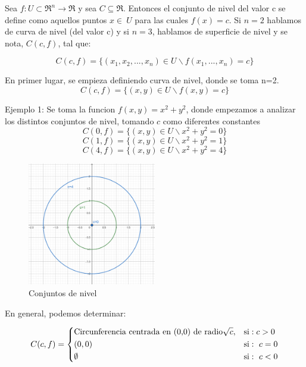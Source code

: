 
\begin{definition}  
\label{def:conjunto de nivel}
 \mbox{}
 
Sea $f: U\subset\Re^n\rightarrow\Re$ y sea $C\subseteq\Re$. Entonces el conjunto de nivel del valor c se define como aquellos puntos $x\in\ U$ para las cuales $f(x)=c$. Si $n=2$ hablamos de curva de nivel (del valor c) y si $n=3$, hablamos de superficie de nivel y se nota, $C(c,f)$, tal que:

 \[
C(c,f)=\{(x_1,x_2,...,x_n) \in U \backslash f (x_1,...,x_n)=c \}
 \]

En primer lugar, se empieza definiendo curva de nivel, donde se toma n=2.
 \[
C(c,f)=\{(x,y) \in U \backslash f (x,y)=c \}
 \]

Ejemplo 1: Se toma la funcion $f(x,y)=x^2+y^2$, donde empezamos a analizar los distintos conjuntos de nivel, tomando $c$ como diferentes constantes
 \[
C(0,f)=\{(x,y) \in U \backslash x^2+y^2=0 \}
\]
 \[
C(1,f)=\{(x,y) \in U \backslash x^2+y^2=1 \}
\]
 \[
C(4,f)=\{(x,y) \in U \backslash x^2+y^2=4 \}
 \]

\begin{figure}[h!] %
    \centering
    \includegraphics[width=0.5\textwidth]{../figs/conjunto1_r.png} %
    \caption{Conjuntos de nivel}
    \label{fig:ejemplo} %
\end{figure}

En general, podemos determinar: 

   \[
        C(c,f)=
        \begin{dcases}
           \textnormal{Circunferencia centrada en (0,0) de radio} \sqrt{c},  & \textnormal{si}:  c>0 \\
(0,0)  & \textnormal{si}:\ c=0\\
\emptyset  & \textnormal{si}:\ c<0\\
        \end{dcases}
    \]


\end{definition}
